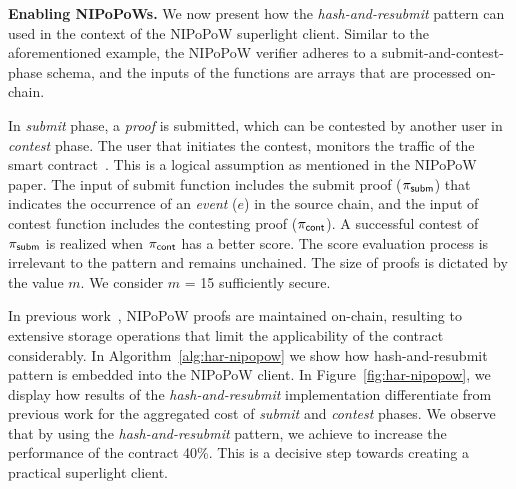 \noindent \textbf{Enabling NIPoPoWs.} We now present how the
\emph{hash-and-resubmit} pattern can used in the context of the NIPoPoW
superlight client. Similar to the aforementioned example, the NIPoPoW verifier
adheres to a submit-and-contest-phase schema, and the inputs of the functions
are arrays that are processed on-chain.

In \emph{submit} phase, a \emph{proof} is submitted, which can be contested by
another user in \emph{contest} phase. The user that initiates the contest,
monitors the traffic of the smart contract~\cite{nipopows}. This is a logical
assumption as mentioned in the NIPoPoW paper. The input of \textsf{submit}
function includes the submit proof ($\mathsf{\pi_{subm}}$) that indicates the occurrence of an
\emph{event} ($e$) in the source chain, and the input of \textsf{contest}
function includes the contesting proof ($\mathsf{\pi_{cont}}$). A successful contest of $\mathsf{\pi_{subm}}$
is realized when $\mathsf{\pi_{cont}}$ has a better score. The score evaluation process is
irrelevant to the pattern and remains unchained. The size of proofs is dictated
by the value $m$. We consider $m$ = 15 sufficiently secure.

In previous work~\cite{gglou}, NIPoPoW proofs are maintained on-chain,
resulting to extensive storage operations that limit the applicability of the
contract considerably. In Algorithm~\ref{alg:har-nipopow} we show how
hash-and-resubmit pattern is embedded into the NIPoPoW client. In
Figure~\ref{fig:har-nipopow}, we display how results of the
\emph{hash-and-resubmit} implementation differentiate from previous work for
the aggregated cost of \emph{submit} and \emph{contest} phases.  We observe
that by using the \emph{hash-and-resubmit} pattern, we achieve to increase the
performance of the contract 40\%. This is a decisive step towards creating a
practical superlight client.



